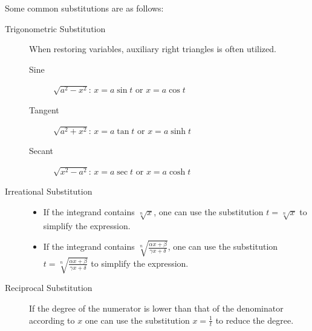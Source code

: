 \documentclass[11pt]{../../TexTemplate/elegantbook}
\begin{document}
Some common substitutions are as follows:
\begin{description}
    \item[Trigonometric Substitution] When restoring variables, auxiliary right triangles is often utilized.
        \begin{description}
            \item[Sine] \( \sqrt{a^2 - x^2} \): \( x = a \sin t \) or \( x = a \cos t \)
            \item[Tangent] \( \sqrt{a^2 + x^2} \): \( x = a \tan t \) or \( x = a \sinh t \)
            \item[Secant] \( \sqrt{x^2 - a^2} \): \( x = a \sec t \) or \( x = a \cosh t \)
        \end{description}
    \item[Irreational Substitution] 
        \begin{itemize}
            \item If the integrand contains \( \sqrt[n]{x} \),
                one can use the substitution \( t = \sqrt[n]{x} \) to simplify the expression.
            \item If the integrand contains \( \sqrt[n]{\frac{\alpha x + \beta}{\gamma x + \delta}} \),
                one can use the substitution \( t = \sqrt[n]{\frac{\alpha x + \beta}{\gamma x + \delta}} \) to simplify the expression.
        \end{itemize}
    \item[Reciprocal Substitution] If the degree of the numerator is lower than that of the denominator according to \(x\) 
        one can use the substitution \( x = \frac{1}{t} \) to reduce the degree.
\end{description}
\end{document}
